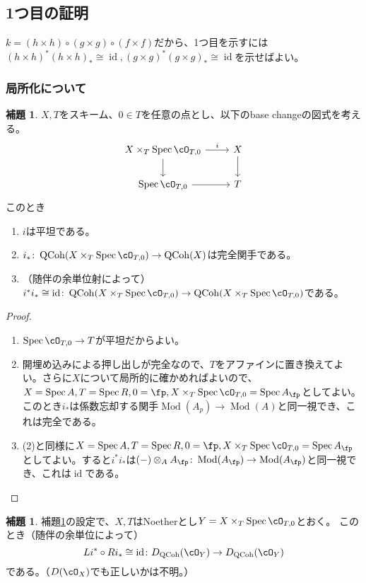\documentclass[uplatex, a4paper, dvipdfmx]{jsarticle}
\theoremstyle{definition}
\newtheorem{lemma}[theorem]{補題}
\DeclareMathOperator{\id}{\mathrm{id}}
\DeclareMathOperator{\Spec}{\mathrm{Spec}}
\DeclareMathOperator{\QCoh}{\mathrm{QCoh}}
\DeclareMathOperator{\Mod}{\mathrm{Mod}}
\begin{document}
\subsection{1つ目の証明}
$k = (h \times h) \circ (g \times g) \circ (f \times f)$だから、1つ目を示すには$(h \times h)^*(h \times h)_* \cong \id, (g \times g)^*(g \times g)_* \cong \id$を示せばよい。
\subsubsection{局所化について}
\begin{lemma}\label{lem:base-change-by-localizaion}
    $X, T$をスキーム、$0 \in T$を任意の点とし、以下のbase changeの図式を考える。
    \[
        \begin{tikzcd}
            X \times_T \Spec \cO_{T, 0} \ar[r, "i"] \ar[d]& X \ar[d]\\
            \Spec \cO_{T, 0} \ar[r]& T
        \end{tikzcd}
    \]
    このとき
    \begin{enumerate}
        \item $i$は平坦である。
        \item $i_* \colon \QCoh(X \times_T \Spec \cO_{T, 0}) \to \QCoh(X)$は完全関手である。
        \item （随伴の余単位射によって）$i^*i_* \cong \id \colon \QCoh( X \times_T \Spec \cO_{T, 0}) \to \QCoh( X \times_T \Spec \cO_{T, 0})$である。
    \end{enumerate}
\end{lemma}
\begin{proof}
    \begin{enumerate}
        \item $\Spec \cO_{T, 0} \to T$が平坦だからよい。
        \item 開埋め込みによる押し出しが完全なので、$T$をアファインに置き換えてよい。さらに$X$について局所的に確かめればよいので、$X = \Spec A, T = \Spec R, 0 = \fp, X \times_T \Spec \cO_{T, 0} = \Spec A_{\fp}$としてよい。このとき$i_*$は係数忘却する関手$\Mod(A_p) \to \Mod(A)$と同一視でき、これは完全である。
        \item (2)と同様に$X = \Spec A, T = \Spec R, 0 = \fp, X \times_T \Spec \cO_{T, 0} = \Spec A_{\fp}$としてよい。すると$i^*i_*$は$(-)\otimes_A A_{\fp} \colon \Mod(A_{\fp}) \to \Mod(A_{\fp})$と同一視でき、これは$\id$である。
    \end{enumerate}
\end{proof}
\begin{lemma}
    補題\ref{lem:base-change-by-localizaion}の設定で、$X, T$はNoetherとし$Y =  X \times_T \Spec \cO_{T, 0}$とおく。
    このとき（随伴の余単位によって）
    \begin{equation}
        Li^* \circ Ri_* \cong \id \colon D_{\QCoh}(\cO_Y) \to D_{\QCoh}(\cO_Y)
    \end{equation}
    である。（$D(\cO_X)$でも正しいかは不明。）
\end{lemma}
\end{document}
